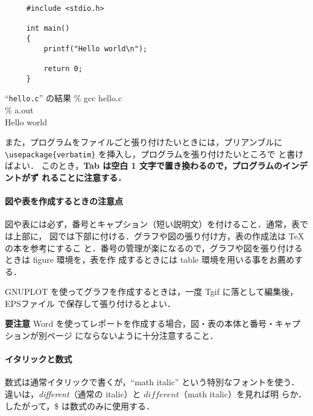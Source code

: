\documentclass[a4j]{jsarticle}  %
\begin{document}
\begin{shadebox}
 \setlength{\baselineskip}{12pt}
 \begin{verbatim}
	 #include <stdio.h>

	 int main()
	 {
	     printf("Hello world\n");

	     return 0;
	 } 
 \end{verbatim}
\end{shadebox}

\begin{itembox}[l]{``\texttt{hello.c}'' の結果}
 \% gcc hello.c \keytop{\return} \\
 \% a.out \keytop{\return} \\
 Hello world
\end{itembox}

また，プログラムをファイルごと張り付けたいときには，プリアンブルに 
\verb+\usepackage{verbatim}+ を挿入し，プログラムを張り付けたいところで 
\verb++ と書けばよい．
このとき，\textbf{Tab は空白 1 文字で置き換わるので，プログラムのインデントがず
れることに注意する．}

\paragraph{図や表を作成するときの注意点}
図や表には必ず，番号とキャプション（短い説明文）を付けること．通常，表では上部に，
図では下部に付ける．グラフや図の張り付け方，表の作成法は \TeX の本を参考にするこ
と．番号の管理が楽になるので，グラフや図を張り付けるときは figure 環境を，表を作
成するときには table 環境を用いる事をお薦めする．

GNUPLOT を使ってグラフを作成するときは，一度 Tgif に落として編集後，EPSファイル
で保存して張り付けるとよい．

\begin{itembox}[l]{\textbf{要注意}}
 Word を使ってレポートを作成する場合，図・表の本体と番号・キャプションが別ページ
 にならないように十分注意すること．
\end{itembox}

\paragraph{イタリックと数式}
数式は通常イタリックで書くが，``math italic'' という特別なフォントを使う．
違いは，{\it different}（通常の italic）と $different$（math italic）を見れば明
らか．したがって，\$ は数式のみに使用する．

\bigskip
\end{document}
